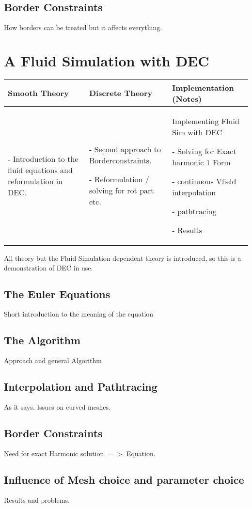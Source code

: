 \documentclass[draft]{scrbook}
\newenvironment{packed_enum}{
\begin{enumerate}
  \setlength{\itemsep}{1pt}
  \setlength{\parskip}{0pt}
  \setlength{\parsep}{0pt}
}{\end{enumerate}}
\begin{document}
	\subsection{Border Constraints}
	How borders can be treated but it affects everything.
\newpage
\section{A Fluid Simulation with DEC}
	\begin{longtable}{|p{4.5cm}|p{4.5cm}|p{4.5cm}|}
		\hline
		Smooth Theory& Discrete Theory& Implementation (Notes)\\
		\hline
			\begin{packed_enum}
				\item[-] Introduction to the fluid equations and reformulation in DEC.
			\end{packed_enum}
			&
			\begin{packed_enum}
				\item[-] Second approach to Borderconstraints.
				\item[-] Reformulation / solving for rot part etc.
			\end{packed_enum}
			 & 
			 Implementing Fluid Sim with DEC
			 \begin{packed_enum}
				\item[-] Solving for Exact harmonic 1 Form
				\item[-] continuous Vfield interpolation
				\item[-] pathtracing
				\item[-] Results
			\end{packed_enum}
			 \\		
		\hline
	\end{longtable}
	All theory but the Fluid Simulation dependent theory is introduced, so this is a demonstration of DEC in use.
	\subsection{The Euler Equations}
	Short introduction to the meaning of the equation
	\subsection{The Algorithm}
	Approach and general Algorithm
	\subsection{Interpolation and Pathtracing}
	As it says. Issues on curved meshes.
	\subsection{Border Constraints}
	Need for exact Harmonic solution $=>$ Equation.
	\subsection{Influence of Mesh choice and parameter choice}
	Results and problems.
\end{document}
